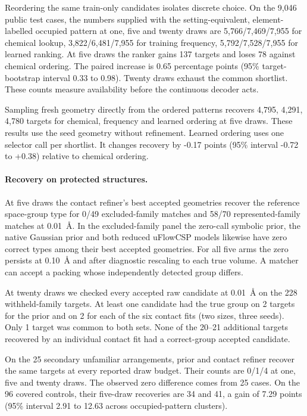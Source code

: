 Reordering the same train-only candidates isolates discrete choice. On the 9,046 public test cases, the numbers supplied with the setting-equivalent, element-labelled occupied pattern at one, five and twenty draws are 5,766/7,469/7,955 for chemical lookup, 3,822/6,481/7,955 for training frequency, 5,792/7,528/7,955 for learned ranking. At five draws the ranker gains 137 targets and loses 78 against chemical ordering. The paired increase is 0.65 percentage points (95\% target-bootstrap interval 0.33 to 0.98). Twenty draws exhaust the common shortlist. These counts measure availability before the continuous decoder acts.

Sampling fresh geometry directly from the ordered patterns recovers 4,795, 4,291, 4,780 targets for chemical, frequency and learned ordering at five draws. These results use the seed geometry without refinement. Learned ordering uses one selector call per shortlist. It changes recovery by -0.17 points (95\% interval -0.72 to +0.38) relative to chemical ordering.

\paragraph{Recovery on protected structures.}

At five draws the contact refiner's best accepted geometries recover the reference space-group type for 0/49 excluded-family matches and 58/70 represented-family matches at 0.01~\AA. In the excluded-family panel the zero-call symbolic prior, the native Gaussian prior and both reduced uFlowCSP models likewise have zero correct types among their best accepted geometries. For all five arms the zero persists at 0.10~\AA{} and after diagnostic rescaling to each true volume. A matcher can accept a packing whose independently detected group differs.

At twenty draws we checked every accepted raw candidate at 0.01~\AA{} on the 228 withheld-family targets. At least one candidate had the true group on 2 targets for the prior and on 2 for each of the six contact fits (two sizes, three seeds). Only 1 target was common to both sets. None of the 20--21 additional targets recovered by an individual contact fit had a correct-group accepted candidate.

On the 25 secondary unfamiliar arrangements, prior and contact refiner recover the same targets at every reported draw budget. Their counts are 0/1/4 at one, five and twenty draws. The observed zero difference comes from 25 cases. On the 96 covered controls, their five-draw recoveries are 34 and 41, a gain of 7.29 points (95\% interval 2.91 to 12.63 across occupied-pattern clusters).

